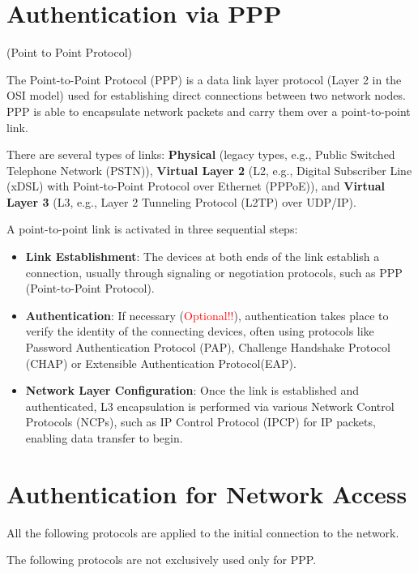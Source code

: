 \section{Authentication via PPP}
\raggedright
    \begin{center}
        (Point to Point Protocol)
    \end{center}
The Point-to-Point Protocol (PPP) is a data link layer protocol (Layer 2 in the OSI model) used for establishing direct connections between two network nodes. PPP is able to encapsulate network packets and carry them over a point-to-point link.

There are several types of links: \textbf{Physical} (legacy types, e.g., Public Switched Telephone Network (PSTN)), \textbf{Virtual Layer 2} (L2, e.g., Digital Subscriber Line (xDSL) with Point-to-Point Protocol over Ethernet (PPPoE)), and \textbf{Virtual Layer 3} (L3, e.g., Layer 2 Tunneling Protocol (L2TP) over UDP/IP).

A point-to-point link is activated in three sequential steps:
\begin{itemize}
    \item \textbf{Link Establishment}: The devices at both ends of the link establish a connection, usually through signaling or negotiation protocols, such as PPP (Point-to-Point Protocol).
    \item \textbf{Authentication}: If necessary (\textcolor{red}{Optional!!}), authentication takes place to verify the identity of the connecting devices, often using protocols like Password Authentication Protocol (PAP), Challenge Handshake Protocol (CHAP) or Extensible Authentication Protocol(EAP).
    \item \textbf{Network Layer Configuration}: Once the link is established and authenticated, L3 encapsulation is performed via various Network Control Protocols (NCPs), such as IP Control Protocol (IPCP) for IP packets, enabling data transfer to begin.
\end{itemize}

\section{Authentication for Network Access}
All the following protocols are applied to the initial connection to the network.
\begin{tcolorbox}[colback=red!10!white, colframe=red!70!black, coltitle=white, title=Be aware]
    The following protocols are not exclusively used only for PPP.
\end{tcolorbox}

